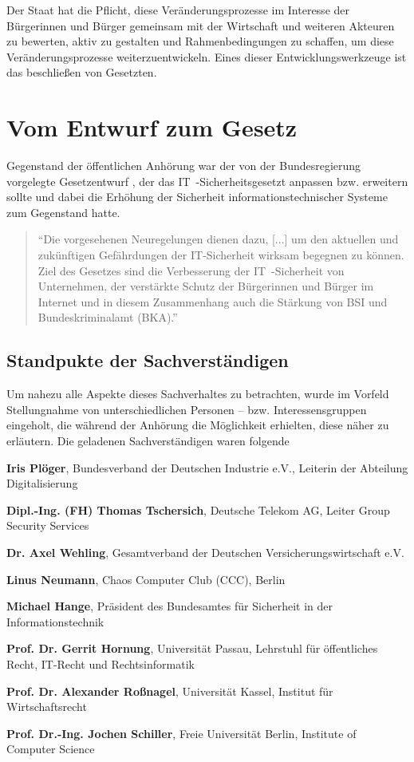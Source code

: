 \documentclass[a4paper,letterpaper,twocolumn,10pt,ngerman]{article}
\newcommand{\descitem}[1]{\textbf{#1}}	%
\begin{document}
Der Staat hat die Pflicht, diese Veränderungsprozesse im Interesse der Bürgerinnen und Bürger gemeinsam mit der Wirtschaft und weiteren Akteuren zu bewerten, aktiv zu gestalten und Rahmenbedingungen zu schaffen, um diese Veränderungsprozesse weiterzuentwickeln. \cite{BMI} Eines dieser Entwicklungswerkzeuge ist das beschließen von Gesetzten.

\section{Vom Entwurf zum Gesetz}
\label{sec:EntwurfzumGesetz}
Gegenstand der öffentlichen Anhörung  war der von der Bundesregierung vorgelegte Gesetzentwurf \cite{GesEntw15}, der das IT~-Sicherheitsgesetzt anpassen bzw. erweitern sollte und dabei die Erhöhung der Sicherheit informationstechnischer Systeme zum Gegenstand hatte. 
\begin{quotation}
"`Die vorgesehenen Neuregelungen dienen dazu, [...] um den aktuellen und zukünftigen Gefährdungen der IT-Sicherheit wirksam begegnen zu können. Ziel des Gesetzes sind die Verbesserung der IT~-Sicherheit von Unternehmen, der verstärkte Schutz der Bürgerinnen und Bürger im Internet und in diesem Zusammenhang auch die Stärkung von BSI und Bundeskriminalamt (BKA)."' \cite[S. 1]{GesEntw15} 
\end{quotation}

\subsection{Standpukte der Sachverständigen}
\label{subsec:StandpunkteSachverständige}
Um nahezu alle Aspekte dieses Sachverhaltes zu betrachten, wurde im Vorfeld Stellungnahme von unterschiedlichen Personen -- bzw. Interessensgruppen eingeholt, die während der Anhörung die Möglichkeit erhielten, diese näher zu erläutern. Die geladenen Sachverständigen waren folgende

\begin{description*}
    \item	{\descitem{Iris Plöger}}, Bundesverband der Deutschen Industrie e.V., Leiterin der Abteilung Digitalisierung
    \item	{\descitem{Dipl.-Ing.  (FH) Thomas Tschersich}}, Deutsche Telekom AG, Leiter Group Security Services
    \item	{\descitem{Dr. Axel Wehling}}, Gesamtverband der Deutschen Versicherungswirtschaft e.V.
    \item	{\descitem{Linus Neumann}}, Chaos Computer Club (CCC), Berlin

	\item	{\descitem{Michael Hange}}, Präsident des Bundesamtes für Sicherheit in der Informationstechnik
    \item	{\descitem{Prof. Dr. Gerrit Hornung}}, Universität Passau, Lehrstuhl für öffentliches Recht, IT-Recht und Rechtsinformatik
    \item	{\descitem{Prof. Dr. Alexander Roßnagel}}, Universität Kassel, Institut für Wirtschaftsrecht
    \item	{\descitem{Prof. Dr.-Ing. Jochen Schiller}}, Freie Universität Berlin, Institute of Computer Science
\end{description*}
\end{document}
